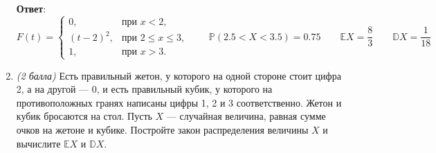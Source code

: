 \documentclass{article}
\begin{document}
\begin{enumerate}
\textbf{Ответ}:
$F(t) = \begin{cases}
    0, &\text{при } x < 2,\\
    (t-2)^2, &\text{при } 2\leq x\leq3,\\
    1, &\text{при } x > 3.
\end{cases} \qquad \mathbb{P}(2.5<X<3.5) = 0.75 \qquad \mathbb{E}X = \dfrac{8}{3} \qquad \mathbb{D}X = \dfrac{1}{18}$

\item \textit{(2 балла)} Есть правильный жетон, у которого на одной стороне стоит цифра 2, а на другой --- 0, и есть правильный кубик, у которого на противоположных гранях написаны цифры 1, 2 и 3 соответственно. Жетон и кубик бросаются на стол. Пусть $X$ --- случайная величина, равная сумме очков на жетоне и кубике. Постройте закон распределения величины $X$ и вычислите $\mathbb{E}X$ и $\mathbb{D}X$.



\end{enumerate}
\end{document}
